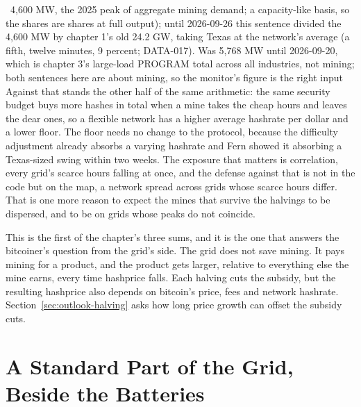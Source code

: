 ~4,600 MW, the 2025 peak of aggregate mining demand; a capacity-like basis, so the shares are shares at full output); until 2026-09-26 this sentence divided the 4,600 MW by chapter 1's old 24.2 GW, taking Texas at the network's average (a fifth, twelve minutes, 9 percent; DATA-017). Was 5,768 MW until 2026-09-20, which is chapter 3's large-load PROGRAM total across all industries, not mining; both sentences here are about mining, so the monitor's figure is the right input
Against that stands the other half of the same arithmetic: the same security budget buys more hashes in total when a mine takes the cheap hours and leaves the dear ones, so a flexible network has a higher average hashrate per dollar and a lower floor. The floor needs no change to the protocol, because the difficulty adjustment already absorbs a varying hashrate and Fern showed it absorbing a Texas-sized swing within two weeks. The exposure that matters is correlation, every grid's scarce hours falling at once, and the defense against that is not in the code but on the map, a network spread across grids whose scarce hours differ. That is one more reason to expect the mines that survive the halvings to be dispersed, and to be on grids whose peaks do not coincide.

This is the first of the chapter's three sums, and it is the one that answers the bitcoiner's question from the grid's side. The grid does not save mining. It pays mining for a product, and the product gets larger, relative to everything else the mine earns, every time hashprice falls. Each halving cuts the subsidy, but the resulting hashprice also depends on bitcoin's price, fees and network hashrate. Section~\ref{sec:outlook-halving} asks how long price growth can offset the subsidy cuts.

\section{A Standard Part of the Grid, Beside the Batteries}
\label{sec:outlook-grid}

